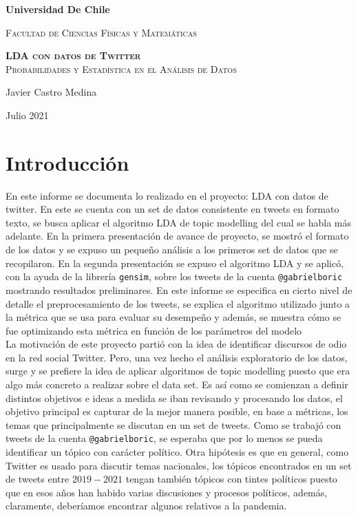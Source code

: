 \documentclass{article}
\begin{document}



\begin{titlepage}
	\centering
	{\bfseries\LARGE Universidad De Chile \par}
	\vspace{1cm}
	{\scshape\Large Facultad de Ciencias Físicas y Matemáticas \par}
	\vspace{3cm}
	{\scshape{\Huge \textbf{LDA con datos de Twitter}}\\
		Probabilidades y Estadística en el Análisis de Datos \par}
	\vfill
	{\Large  Javier Castro Medina\par}

	\vfill
	{\Large Julio 2021 \par}
\end{titlepage}
\newpage
\section{Introducción}
En este informe se documenta lo realizado en el proyecto: LDA con datos de twitter. En este se cuenta con un set de datos consistente en tweets en formato texto, se busca aplicar el algoritmo LDA de topic modelling del cual se habla más adelante. En la primera presentación de avance de proyecto, se mostró el formato de los datos y se expuso un pequeño análisis a los primeros set de datos que se recopilaron. En la segunda presentación se expuso el algoritmo LDA y se aplicó, con la ayuda de la librería \texttt{gensim}, sobre los tweets de la cuenta \texttt{@gabrielboric} mostrando resultados preliminares. En este informe se especifica en cierto nivel de detalle el preprocesamiento de los tweets, se explica el algoritmo utilizado junto a la métrica que se usa para evaluar su desempeño y además, se muestra cómo se fue optimizando esta métrica en función de los parámetros del modelo\\

La motivación de este proyecto partió con la idea de identificar discursos de odio en la red social Twitter. Pero, una vez hecho el análisis exploratorio de los datos, surge y se prefiere la idea de aplicar algoritmos de topic modelling puesto que era algo más concreto a realizar sobre el data set. Es así como se comienzan a definir distintos objetivos e ideas a medida se iban revisando y procesando los datos, el objetivo principal es capturar de la mejor manera posible, en base a métricas, los temas que principalmente se discutan en un set de tweets. Como se trabajó con tweets de la cuenta \texttt{@gabrielboric}, se esperaba que por lo menos se pueda identificar un tópico con carácter político. Otra hipótesis es que en general, como Twitter es usado para discutir temas nacionales, los tópicos encontrados en un set de tweets entre $2019-2021$ tengan también tópicos con tintes políticos puesto que en esos años han habido varias discusiones y procesos políticos, además, claramente, deberíamos encontrar algunos relativos a la pandemia.\\
\end{document}
